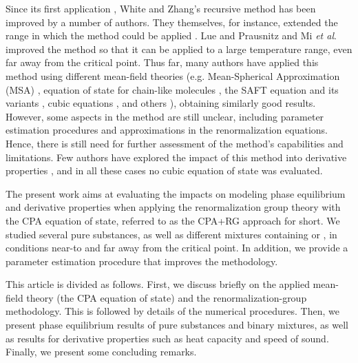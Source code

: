 \documentclass[preprint,12pt,3p]{elsarticle}
\begin{document}
Since its first application \citep{white1993renormalization}, White and Zhang’s recursive method has been improved by a number of authors.
They themselves, for instance, extended the range in which the method could be applied \cite{white1998renormalization}.
Lue and Prausnitz \cite{lue1998renormalization, lue1998brenormalization} and Mi \textit{et al}. \cite{mi2004improved} improved the method so that it can be applied to a large temperature range, even far away from the critical point.
Thus far, many authors have applied this method using different mean-field theories (e.g.
Mean-Spherical Approximation (MSA) \citep{lue1998renormalization}, equation of state for chain-like molecules \cite{jiang1999equation, jiang2000phase}, the SAFT equation and its variants \cite{llovell2004thermodynamic, forte2011application, bymaster2008renormalization, tang2010renormalization, llovell2006global, forte2013application, dias2009thermodynamic, llovell2006second, llovell2006prediction, llovell2007phase}, cubic equations \cite{xu2011prediction,xu2010crossover,pcm2017application,llovell2008accurate,qiu2006vapor,cai2006vapor,cai2004thermodynamics,vinhal2018application}, and others \cite{ghobadi2013renormalization,choi2016renormalization}), obtaining similarly good results.
However, some aspects in the method are still unclear, including parameter estimation procedures and approximations in the renormalization equations.
Hence, there is still need for further assessment of the method's capabilities and limitations. Few authors have explored the impact of this method into derivative properties \cite{forte2013application,llovell2006second,llovell2007phase,dias2009thermodynamic}, and in all these cases no cubic equation of state was evaluated.

The present work aims at evaluating the impacts on modeling phase equilibrium and derivative properties when applying the renormalization group theory with the CPA equation of state, referred to as the CPA+RG approach for short.
We studied several pure substances, as well as different mixtures containing  or , in conditions near-to and far away from the critical point.
In addition, we provide a parameter estimation procedure that improves the methodology.

This article is divided as follows.
First, we discuss briefly on the applied mean-field theory (the CPA equation of state) and the renormalization-group methodology.
This is followed by details of the numerical procedures.
Then, we present phase equilibrium results of pure substances and binary mixtures, as well as results for derivative properties such as heat capacity and speed of sound.
Finally, we present some concluding remarks.
\end{document}
